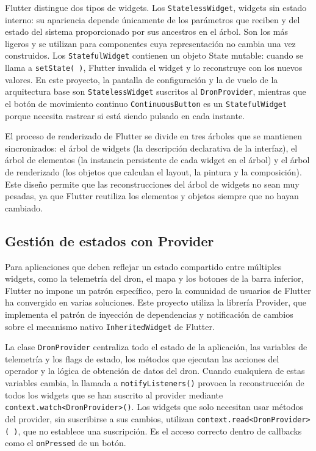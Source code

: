 Flutter distingue dos tipos de widgets. Los \texttt{StatelessWidget}, widgets sin estado interno: su apariencia depende únicamente de los parámetros que reciben y del estado del sistema proporcionado por sus ancestros en el árbol. Son los más ligeros y se utilizan para componentes cuya representación no cambia una vez construidos. Los \texttt{StatefulWidget} contienen un objeto State mutable: cuando se llama a \texttt{setState( )}, Flutter invalida el widget y lo reconstruye con los nuevos valores. En este proyecto, la pantalla de configuración y la de vuelo de la arquitectura base son \texttt{StatelessWidget} suscritos al \texttt{DronProvider}, mientras que el botón de movimiento continuo \texttt{ContinuousButton} es un \texttt{StatefulWidget} porque necesita rastrear si está siendo pulsado en cada instante.

El proceso de renderizado de Flutter se divide en tres árboles que se mantienen sincronizados: el árbol de widgets (la descripción declarativa de la interfaz), el árbol de elementos (la instancia persistente de cada widget en el árbol) y el árbol de renderizado (los objetos que calculan el layout, la pintura y la composición). Este diseño permite que las reconstrucciones del árbol de widgets no sean muy pesadas, ya que Flutter reutiliza los elementos y objetos siempre que no hayan cambiado.

\subsection{Gestión de estados con Provider}
Para aplicaciones que deben reflejar un estado compartido entre múltiples widgets, como la telemetría del dron, el mapa y los botones de la barra inferior, Flutter no impone un patrón específico, pero la comunidad de usuarios de Flutter ha convergido en varias soluciones. Este proyecto utiliza la librería Provider\cite{provider}, que implementa el patrón de inyección de dependencias y notificación de cambios sobre el mecanismo nativo \texttt{InheritedWidget} de Flutter.

La clase \texttt{DronProvider} centraliza todo el estado de la aplicación, las variables de telemetría y los flags de estado, los métodos que ejecutan las acciones del operador y la lógica de obtención de datos del dron. Cuando cualquiera de estas variables cambia, la llamada a \texttt{notifyListeners()} provoca la reconstrucción de todos los widgets que se han suscrito al provider mediante \texttt{context.watch<DronProvider>()}. Los widgets que solo necesitan usar métodos del provider, sin suscribirse a sus cambios, utilizan \texttt{context.read<DronProvider>( )}, que no establece una suscripción. Es el acceso correcto dentro de callbacks como el \texttt{onPressed} de un botón.

